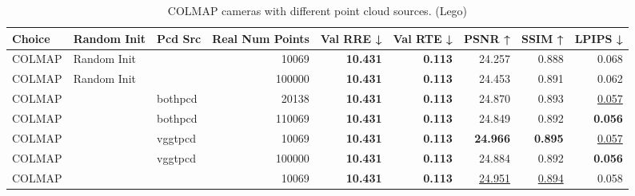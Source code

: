 \begin{table}[H]
\caption{COLMAP cameras with different point cloud sources. (Lego)}
\label{tab:06_isolated_cams_point_clouds_lego}
\small
\begin{tabular}{lllrrrrrr}
\toprule
Choice & Random Init & Pcd Src & Real Num Points & Val RRE ↓ & Val RTE ↓ & PSNR ↑ & SSIM ↑ & LPIPS ↓ \\
\midrule
COLMAP & Random Init &  & 10069 & \textbf{10.431} & \textbf{0.113} & 24.257 & 0.888 & 0.068 \\
COLMAP & Random Init &  & 100000 & \textbf{10.431} & \textbf{0.113} & 24.453 & 0.891 & 0.062 \\
COLMAP &  & bothpcd & 20138 & \textbf{10.431} & \textbf{0.113} & 24.870 & 0.893 & \underline{0.057} \\
COLMAP &  & bothpcd & 110069 & \textbf{10.431} & \textbf{0.113} & 24.849 & 0.892 & \textbf{0.056} \\
COLMAP &  & vggtpcd & 10069 & \textbf{10.431} & \textbf{0.113} & \textbf{24.966} & \textbf{0.895} & \underline{0.057} \\
COLMAP &  & vggtpcd & 100000 & \textbf{10.431} & \textbf{0.113} & 24.884 & 0.892 & \textbf{0.056} \\
COLMAP &  &  & 10069 & \textbf{10.431} & \textbf{0.113} & \underline{24.951} & \underline{0.894} & 0.058 \\
\bottomrule
\end{tabular}
\end{table}